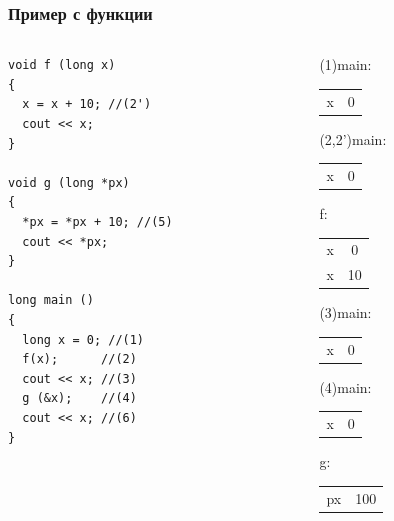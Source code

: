 \documentclass{beamer}
\begin{document}
\begin{frame}[fragile]
\frametitle{Пример с функции}
\begin{columns}[t]
  \begin{column}{0.4\textwidth}
\begin{flushleft}
\begin{lstlisting}
void f (long x)
{
  x = x + 10; //(2')
  cout << x;
}

void g (long *px)
{
  *px = *px + 10; //(5)
  cout << *px;
}

long main ()
{
  long x = 0; //(1)
  f(x);      //(2)
  cout << x; //(3)
  g (&x);    //(4)
  cout << x; //(6)
}
\end{lstlisting}
\end{flushleft}

  \end{column}
  \begin{column}{0.3\textwidth}

  (1)main:

  \begin{tabular}{c|c}
  x & 0 
  \end{tabular}

\pause

  \vspace{10px}
  (2,2')main:

  \begin{tabular}{c|c}
  x & 0 
  \end{tabular}

  f:

  \begin{tabular}{c|c}
  x & 0 \\\pause
  x & \alert {10}
  \end{tabular}

\pause

  \vspace{10px}
  (3)main:

  \begin{tabular}{c|c}
  x & 0 
  \end{tabular}

\pause

  \vspace{10px}
  (4)main:

  \begin{tabular}{c|c}
  x & 0 
  \end{tabular}

  g:

  \begin{tabular}{c|c}
  px & 100 
  \end{tabular}




\end{column}
\end{columns}
\end{frame}
\end{document}
